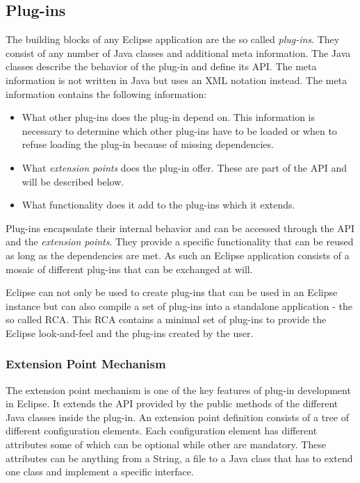 \subsection{Plug-ins}
\label{section:ConfTechPlugins}
The building blocks of any Eclipse application are the so called \textit{plug-ins}. They
consist of any number of Java classes and additional meta information. The Java classes
describe the behavior of the plug-in and define its \ac{API}. The meta information is not written
in Java but uses an \ac{XML} notation instead. The meta information contains the following
information:
\begin{itemize}
 \item What other plug-ins does the plug-in depend on. This information is necessary to determine
which other plug-ins have to be loaded or when to refuse loading the plug-in because of missing
dependencies.
 \item What \textit{extension points} does the plug-in offer. These are part of the \ac{API} and
will be described below.
 \item What functionality does it add to the plug-ins which it extends.
\end{itemize}

Plug-ins encapsulate their internal behavior and can be accessed through the \ac{API} and the 
\textit{extension points}. They provide a specific functionality that can be reused as long as
the dependencies are met. As such an Eclipse application consists of a mosaic of different
plug-ins that can be exchanged at will.

Eclipse can not only be used to create plug-ins that can be used in an Eclipse
instance but can also compile a set of plug-ins into a standalone application - the so
called \ac{RCA}. This \ac{RCA} contains a minimal set of plug-ins to provide the Eclipse
look-and-feel and the plug-ins created by the user.

\subsubsection{Extension Point Mechanism}
\label{section:ConfTechExtension}
The extension point mechanism is one of the key features of plug-in development in Eclipse.
It extends the \ac{API} provided by the public methods of the different Java classes inside
the plug-in. An extension point definition consists of a tree of different configuration elements.
Each configuration element has different attributes some of which can be optional while other
are mandatory. These attributes can be anything from a String, a file to a Java class that has
to extend one class and implement a specific interface.

